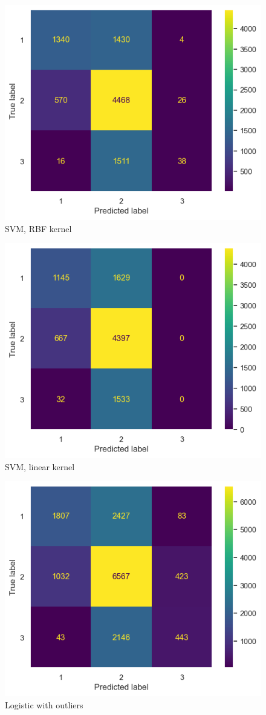 \documentclass[twocolumn]{article}
\begin{document}
\begin{figure}
    \centering
    \includegraphics[width=0.65\columnwidth]{svmrbf.png}
    \caption{SVM, RBF kernel}
\end{figure}
\begin{figure}[h]
    \centering
    \includegraphics[width=0.65\columnwidth]{svmli.png}
    \caption{SVM, linear kernel}
\end{figure}
\begin{figure}
    \centering
    \includegraphics[width=0.65\columnwidth]{logisticWithOutliers.png}
    \caption{Logistic with outliers}
\end{figure}
\end{document}
